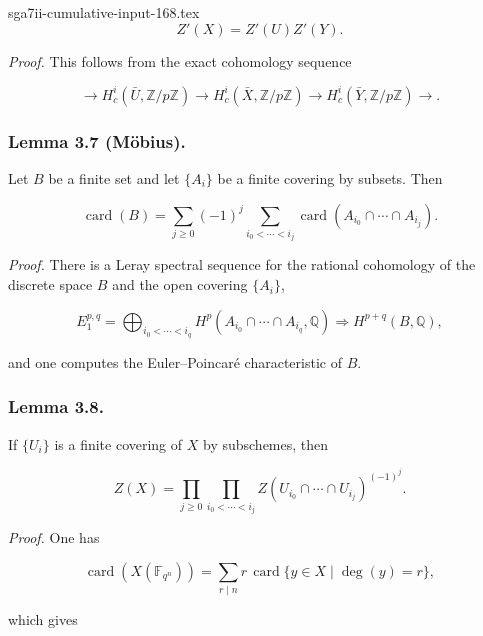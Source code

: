 \begin{filecontents*}{sga7ii-cumulative-input-168.tex}
\begin{equation}\tag{3.6.1}
Z'(X)=Z'(U)Z'(Y).
\end{equation}

\medskip
\noindent\emph{Proof.}
This follows from the exact cohomology sequence

\begin{equation}\tag{3.6.2}
\longrightarrow H_c^i(\bar U,\mathbb Z/p\mathbb Z)
\longrightarrow H_c^i(\bar X,\mathbb Z/p\mathbb Z)
\longrightarrow H_c^i(\bar Y,\mathbb Z/p\mathbb Z)\longrightarrow.
\end{equation}

\subsubsection*{Lemma 3.7 (M\"obius).}
Let $B$ be a finite set and let $\{A_i\}$ be a finite covering by subsets.
Then

\begin{equation}\tag{3.7.1}
\operatorname{card}(B)=
\sum_{j\geq0}(-1)^j
\sum_{i_0<\cdots<i_j}
\operatorname{card}(A_{i_0}\cap\cdots\cap A_{i_j}).
\end{equation}

\medskip
\noindent\emph{Proof.}
There is a Leray spectral sequence for the rational cohomology of the discrete
space $B$ and the open covering $\{A_i\}$,

\[
E_1^{p,q}=\bigoplus_{i_0<\cdots<i_q}
H^p(A_{i_0}\cap\cdots\cap A_{i_q},\mathbb Q)
\Longrightarrow H^{p+q}(B,\mathbb Q),
\]

and one computes the Euler--Poincar\'e characteristic of $B$.

\subsubsection*{Lemma 3.8.}
If $\{U_i\}$ is a finite covering of $X$ by subschemes, then

\begin{equation}\tag{3.8.1}
Z(X)=
\prod_{j\geq0}
\prod_{i_0<\cdots<i_j}
Z(U_{i_0}\cap\cdots\cap U_{i_j})^{(-1)^j}.
\end{equation}

\medskip
\noindent\emph{Proof.}
One has

\begin{equation}\tag{3.8.2}
\operatorname{card}(X(\mathbb F_{q^n}))
=\sum_{r\mid n}r\,\operatorname{card}\{y\in X\mid\deg(y)=r\},
\end{equation}

which gives


\end{filecontents*}
